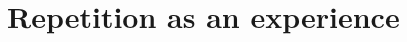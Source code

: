 \graphicspath{{main/chapter1/Intro: structural repeat/figs/}}
\section{Repetition as an experience}

